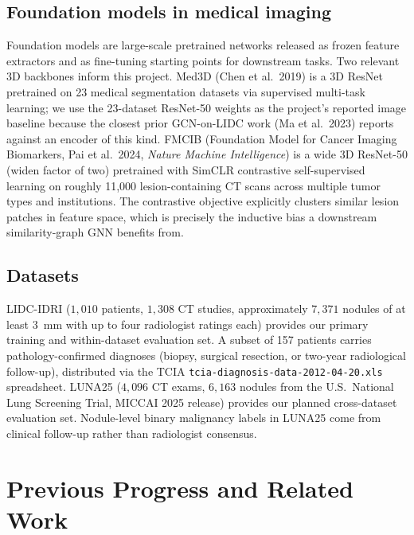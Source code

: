 \documentclass[10pt,letterpaper,twocolumn]{article}
\begin{document}
\subsection{Foundation models in medical imaging}

Foundation models are large-scale pretrained networks released as frozen feature extractors and as fine-tuning starting points for downstream tasks. Two relevant 3D backbones inform this project. Med3D (Chen et al.\ 2019) is a 3D ResNet pretrained on 23 medical segmentation datasets via supervised multi-task learning; we use the 23-dataset ResNet-50 weights as the project's reported image baseline because the closest prior GCN-on-LIDC work (Ma et al.\ 2023) reports against an encoder of this kind. FMCIB (Foundation Model for Cancer Imaging Biomarkers, Pai et al.\ 2024, \textit{Nature Machine Intelligence}) is a wide 3D ResNet-50 (widen factor of two) pretrained with SimCLR contrastive self-supervised learning on roughly 11{,}000 lesion-containing CT scans across multiple tumor types and institutions. The contrastive objective explicitly clusters similar lesion patches in feature space, which is precisely the inductive bias a downstream similarity-graph GNN benefits from.

\subsection{Datasets}

LIDC-IDRI ($1{,}010$ patients, $1{,}308$ CT studies, approximately $7{,}371$ nodules of at least 3~mm with up to four radiologist ratings each) provides our primary training and within-dataset evaluation set. A subset of 157 patients carries pathology-confirmed diagnoses (biopsy, surgical resection, or two-year radiological follow-up), distributed via the TCIA \texttt{tcia-diagnosis-data-2012-04-20.xls} spreadsheet. LUNA25 ($4{,}096$ CT exams, $6{,}163$ nodules from the U.S.\ National Lung Screening Trial, MICCAI 2025 release) provides our planned cross-dataset evaluation set. Nodule-level binary malignancy labels in LUNA25 come from clinical follow-up rather than radiologist consensus.

\section{Previous Progress and Related Work}
\label{sec:related}
\end{document}
